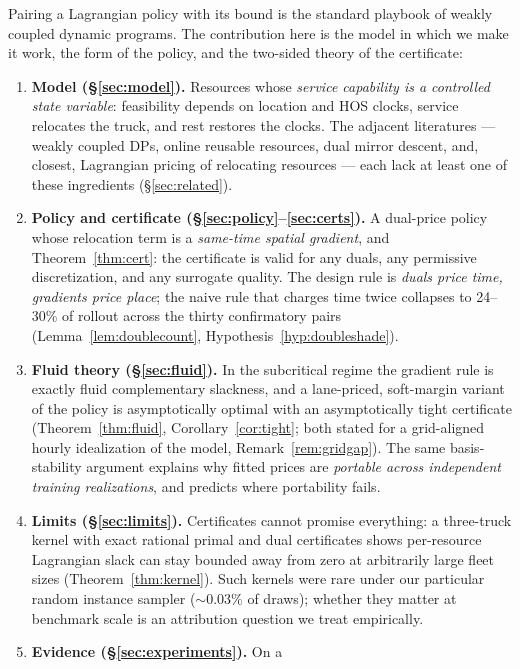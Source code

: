 \documentclass[11pt]{article}
\begin{document}
Pairing a Lagrangian policy with its bound is the standard playbook of
weakly coupled dynamic programs. The contribution here is the model in
which we make it work, the form of the policy, and the two-sided theory
of the certificate:

\begin{enumerate}
\item \textbf{Model (\S\ref{sec:model}).} Resources whose \emph{service
  capability is a controlled state variable}: feasibility depends on
  location and HOS clocks, service relocates the truck, and rest
  restores the clocks. The adjacent literatures --- weakly coupled
  DPs, online reusable resources, dual mirror descent, and, closest,
  Lagrangian pricing of relocating resources
  \citep{balseirobrownchen2021relocating} --- each lack at
  least one of these ingredients (\S\ref{sec:related}).
\item \textbf{Policy and certificate
  (\S\ref{sec:policy}--\ref{sec:certs}).} A dual-price policy whose
  relocation term is a \emph{same-time spatial gradient}, and
  Theorem~\ref{thm:cert}: the certificate is valid for any duals, any
  permissive discretization, and any surrogate quality. The design
  rule is \emph{duals price time, gradients price place}; the naive
  rule that charges time twice collapses to 24--30\% of rollout
  across the thirty confirmatory pairs (Lemma~\ref{lem:doublecount},
  Hypothesis~\ref{hyp:doubleshade}).
\item \textbf{Fluid theory (\S\ref{sec:fluid}).} In the subcritical
  regime the gradient rule is exactly fluid complementary slackness,
  and a lane-priced, soft-margin variant of the policy is
  asymptotically optimal with an asymptotically tight certificate
  (Theorem~\ref{thm:fluid}, Corollary~\ref{cor:tight}; both stated
  for a grid-aligned hourly idealization of the model,
  Remark~\ref{rem:gridgap}). The same
  basis-stability argument explains why fitted prices are
  \emph{portable across independent training realizations}, and
  predicts where portability fails.
\item \textbf{Limits (\S\ref{sec:limits}).} Certificates cannot
  promise everything: a three-truck kernel with exact rational primal
  and dual certificates shows per-resource Lagrangian slack can stay
  bounded away from zero at arbitrarily large fleet sizes
  (Theorem~\ref{thm:kernel}). Such kernels were rare under our
  particular random instance sampler (${\sim}0.03\%$ of draws);
  whether they matter at benchmark scale is an attribution question we
  treat empirically.
\item \textbf{Evidence (\S\ref{sec:experiments}).} On a

\end{enumerate}
\end{document}
